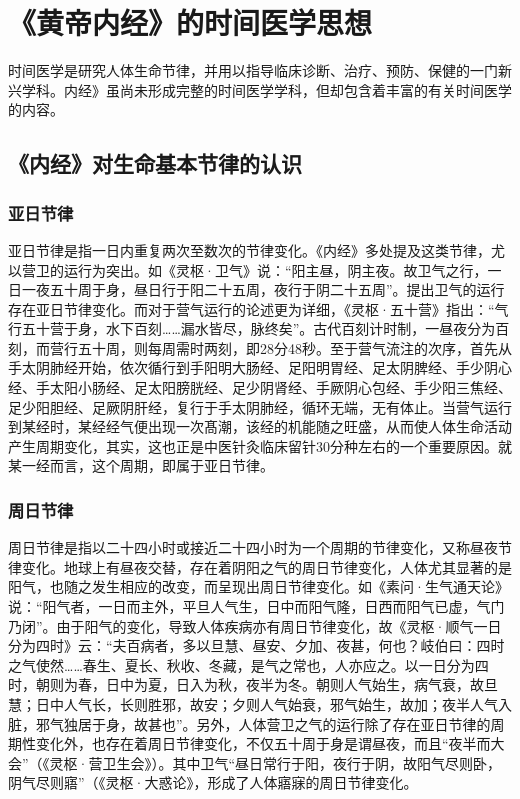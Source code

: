 \documentclass[draft,12pt]{ctexbook}
\begin{document}
\pagestyle{main}
\fi
\chapter{《黄帝内经》的时间医学思想}%
时间医学是研究人体生命节律，并用以指导临床诊断、治疗、预防、保健的一门新兴学科。内经》虽尚未形成完整的时间医学学科，但却包含着丰富的有关时间医学的内容。

\section{《内经》对生命基本节律的认识}%

\subsection{亚日节律}%

亚日节律是指一日内重复两次至数次的节律变化。《内经》多处提及这类节律，尤以营卫的运行为突出。如《灵枢·卫气》说：“阳主昼，阴主夜。故卫气之行，一日一夜五十周于身，昼日行于阳二十五周，夜行于阴二十五周”。提出卫气的运行存在亚日节律变化。而对于营气运行的论述更为详细，《灵枢·五十营》指出：“气行五十营于身，水下百刻……漏水皆尽，脉终矣”。古代百刻计时制，一昼夜分为百刻，而营行五十周，则每周需时两刻，即28分48秒。至于营气流注的次序，首先从手太阴肺经开始，依次循行到手阳明大肠经、足阳明胃经、足太阴脾经、手少阴心经、手太阳小肠经、足太阳膀胱经、足少阴肾经、手厥阴心包经、手少阳三焦经、足少阳胆经、足厥阴肝经，复行于手太阴肺经，循环无端，无有体止。当营气运行到某经时，某经经气便出现一次髙潮，该经的机能随之旺盛，从而使人体生命活动产生周期变化，其实，这也正是中医针灸临床留针30分种左右的一个重要原因。就某一经而言，这个周期，即属于亚日节律。

\subsection{周日节律}%

周日节律是指以二十四小时或接近二十四小时为一个周期的节律变化，又称昼夜节律变化。地球上有昼夜交替，存在着阴阳之气的周日节律变化，人体尤其显著的是阳气，也随之发生相应的改变，而呈现出周日节律变化。如《素问·生气通天论》说：“阳气者，一日而主外，平旦人气生，日中而阳气隆，日西而阳气已虚，气门乃闭”。由于阳气的变化，导致人体疾病亦有周日节律变化，故《灵枢·顺气一日分为四时》云：“夫百病者，多以旦慧、昼安、夕加、夜甚，何也？岐伯曰：四时之气使然……春生、夏长、秋收、冬藏，是气之常也，人亦应之。以一日分为四时，朝则为春，日中为夏，日入为秋，夜半为冬。朝则人气始生，病气衰，故旦慧；日中人气长，长则胜邪，故安；夕则人气始衰，邪气始生，故加；夜半人气入脏，邪气独居于身，故甚也”。另外，人体营卫之气的运行除了存在亚日节律的周期性变化外，也存在着周日节律变化，不仅五十周于身是谓昼夜，而且“夜半而大会”（《灵枢·营卫生会》）。其中卫气“昼日常行于阳，夜行于阴，故阳气尽则卧，阴气尽则寤”（《灵枢·大惑论》，形成了人体寤寐的周日节律变化。
\end{document}
